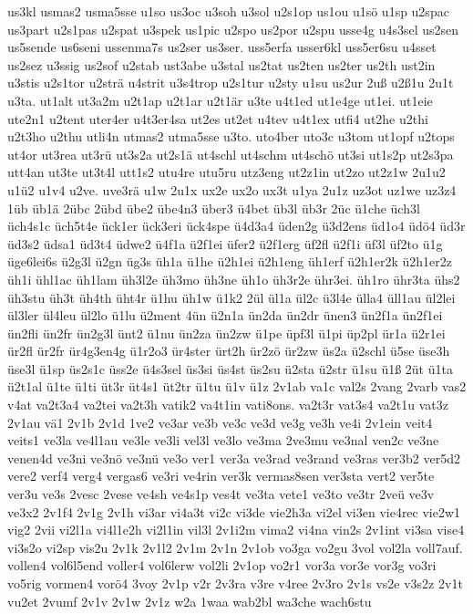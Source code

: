 {us3kl
usmas2
usma5sse
u1so
us3oc
u3soh
u3sol
u2s1op
us1ou
u1sö
u1sp
u2spac
us3part
u2s1pas
u2spat
u3spek
us1pic
u2spo
us2por
u2spu
usse4g
u4s3sel
us2sen
us5sende
us6seni
ussenma7s
us2ser
us3ser.
uss5erfa
usser6kl
uss5er6su
u4sset
us2sez
u3ssig
us2sof
u2stab
ust3abe
u3stal
us2tat
us2ten
us2ter
us2th
ust2in
u3stis
u2s1tor
u2strä
u4strit
u3s4trop
u2s1tur
u2sty
u1su
us2ur
2uß
u2ß1u
2u1t
u3ta.
ut1alt
ut3a2m
u2t1ap
u2t1ar
u2t1är
u3te
u4t1ed
ut1e4ge
ut1ei.
ut1eie
ute2n1
u2tent
uter4er
u4t3er4sa
ut2es
ut2et
u4tev
u4t1ex
utfi4
ut2he
u2thi
u2t3ho
u2thu
utli4n
utmas2
utma5sse
u3to.
uto4ber
uto3c
u3tom
ut1opf
u2tops
ut4or
ut3rea
ut3rü
ut3s2a
ut2s1ä
ut4schl
ut4schm
ut4schö
ut3si
ut1s2p
ut2s3pa
utt4an
ut3te
ut3t4l
utt1s2
utu4re
utu5ru
utz3eng
ut2z1in
ut2zo
ut2z1w
2u1u2
u1ü2
u1v4
u2ve.
uve3rä
u1w
2u1x
ux2e
ux2o
ux3t
u1ya
2u1z
uz3ot
uz1we
uz3z4
1üb
üb1ä
2übc
2übd
übe2
übe4n3
über3
ü4bet
üb3l
üb3r
2üc
ü1che
üch3l
üch4s1c
üch5t4e
ück1er
ück3eri
ück4spe
ü4d3a4
üden2g
ü3d2ens
üd1o4
üdö4
üd3r
üd3s2
üdsa1
üd3t4
üdwe2
ü4f1a
ü2f1ei
üfer2
ü2f1erg
üf2fl
ü2f1i
üf3l
üf2to
ü1g
üge6lei6s
ü2g3l
ü2gn
üg3s
üh1a
ü1he
ü2h1ei
ü2h1eng
üh1erf
ü2h1er2k
ü2h1er2z
üh1i
ühl1ac
üh1lam
üh3l2e
üh3mo
üh3ne
üh1o
üh3r2e
ühr3ei.
üh1ro
ühr3ta
ühs2
üh3stu
üh3t
üh4th
üht4r
ü1hu
üh1w
ü1k2
2ül
ül1a
ül2c
ü3l4e
ülla4
üll1au
ül2lei
ül3ler
ül4leu
ül2lo
ü1lu
ü2ment
4ün
ü2n1a
ün2da
ün2dr
ünen3
ün2f1a
ün2f1ei
ün2fli
ün2fr
ün2g3l
ünt2
ü1nu
ün2za
ün2zw
ü1pe
üpf3l
ü1pi
üp2pl
ür1a
ü2r1ei
ür2fl
ür2fr
ür4g3en4g
ü1r2o3
ür4ster
ürt2h
ür2zö
ür2zw
üs2a
ü2schl
ü5se
üse3h
üse3l
ü1sp
üs2s1c
üss2e
ü4s3sel
üs3si
üs4st
üs2su
ü2sta
ü2str
ü1su
ü1ß
2üt
ü1ta
ü2t1al
ü1te
ü1ti
üt3r
üt4s1
üt2tr
ü1tu
ü1v
ü1z
2v1ab
va1c
val2s
2vang
2varb
vas2
v4at
va2t3a4
va2tei
va2t3h
vatik2
va4t1in
vati8ons.
va2t3r
vat3s4
va2t1u
vat3z
2v1au
vä1
2v1b
2v1d
1ve2
ve3ar
ve3b
ve3c
ve3d
ve3g
ve3h
ve4i
2v1ein
veit4
veits1
ve3la
ve4l1au
ve3le
ve3li
vel3l
ve3lo
ve3ma
2ve3mu
ve3nal
ven2c
ve3ne
venen4d
ve3ni
ve3nö
ve3nü
ve3o
ver1
ver3a
ve3rad
ve3rand
ve3ras
ver3b2
ver5d2
vere2
verf4
verg4
vergas6
ve3ri
ve4rin
ver3k
vermas8sen
ver3sta
vert2
ver5te
ver3u
ve3s
2vesc
2vese
ve4sh
ve4s1p
ves4t
ve3ta
vete1
ve3to
ve3tr
2veü
ve3v
ve3x2
2v1f4
2v1g
2v1h
vi3ar
vi4a3t
vi2c
vi3de
vie2h3a
vi2el
vi3en
vie4rec
vie2w1
vig2
2vii
vi2l1a
vi4l1e2h
vi2l1in
vil3l
2v1i2m
vima2
vi4na
vin2s
2v1int
vi3sa
vise4
vi3s2o
vi2sp
vis2u
2v1k
2v1l2
2v1m
2v1n
2v1ob
vo3ga
vo2gu
3vol
vol2la
voll7auf.
vollen4
vol6l5end
voller4
vol6lerw
vol2li
2v1op
vo2r1
vor3a
vor3e
vor3g
vo3ri
vo5rig
vormen4
vorö4
3voy
2v1p
v2r
2v3ra
v3re
v4ree
2v3ro
2v1s
vs2e
v3s2z
2v1t
vu2et
2vumf
2v1v
2v1w
2v1z
w2a
1waa
wab2bl
wa3che
wach6stu
}
